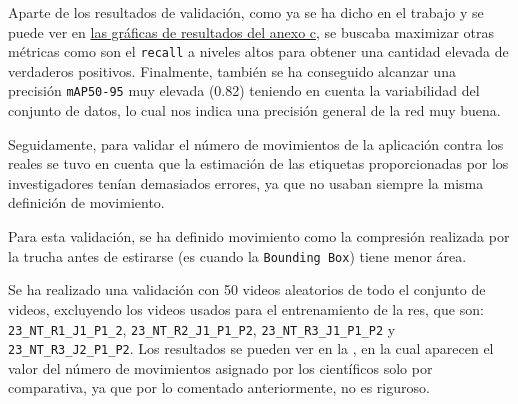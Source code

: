 Aparte de los resultados de validación, como ya se ha dicho en el trabajo y se puede ver en \hyperref[train:final]{las gráficas de resultados del anexo c}, se buscaba maximizar otras métricas como son 
el \texttt{recall} a niveles altos para obtener una cantidad elevada de verdaderos 
positivos. Finalmente, también se ha conseguido alcanzar una precisión \texttt{mAP50-95} muy elevada (0.82) teniendo en cuenta la variabilidad del conjunto de datos, lo cual nos indica una precisión 
general de la red muy buena.

\clearpage

Seguidamente, para validar el número de movimientos de la aplicación contra los reales se tuvo en cuenta que la estimación de las etiquetas proporcionadas por los investigadores tenían demasiados errores, ya que 
no usaban siempre la misma definición de movimiento.

Para esta validación, se ha definido movimiento como la compresión realizada por la trucha antes de estirarse (es cuando la \texttt{Bounding Box}) tiene menor área.

Se ha realizado una validación con 50 videos aleatorios de todo el conjunto de videos, excluyendo los videos usados para el entrenamiento de la res, que son: \verb|23_NT_R1_J1_P1_2|, \verb|23_NT_R2_J1_P1_P2|, \verb|23_NT_R3_J1_P1_P2| 
y \verb|23_NT_R3_J2_P1_P2|. Los resultados se pueden ver en la , en la cual aparecen el valor del número de movimientos asignado por los científicos solo por comparativa, ya que por lo comentado anteriormente, no es riguroso.